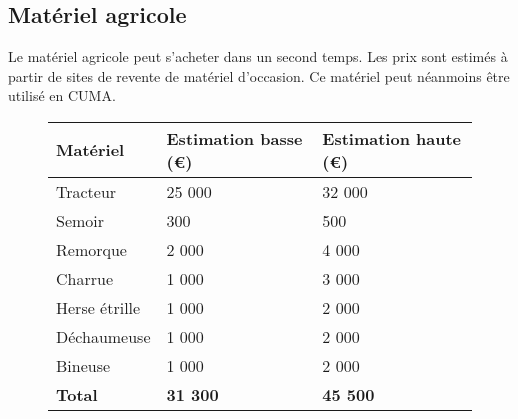 \documentclass{article}
\begin{document}
\subsection{Matériel agricole}

Le matériel agricole peut s'acheter dans un second temps. Les prix sont estimés à partir de sites de revente de matériel d'occasion. Ce matériel peut néanmoins être utilisé en CUMA.

\begin{figure}[h!]
\begin{center}
\begin{tabular}{|p{4cm}|p{3.5cm}|p{3.5cm}|}
\hline
 Matériel & Estimation basse (\euro{}) & Estimation haute (\euro{})\\
\hline
Tracteur &\hfill 25 000 & \hfill 32 000 \\
Semoir &  \hfill 300 &  \hfill 500 \\
Remorque & \hfill 2 000 & \hfill 4 000 \\
Charrue & \hfill 1 000 & \hfill 3 000 \\
Herse étrille & \hfill 1 000 & \hfill 2 000 \\
Déchaumeuse & \hfill 1 000 & \hfill 2 000 \\
Bineuse & \hfill 1 000 & \hfill 2 000 \\
\hline
\textbf{Total} & \hfill \textbf{31 300} & \hfill \textbf{45 500}
\\
\hline
\end{tabular}
\end{center}
\label{sejour_semaine}
\end{figure}
\end{document}
